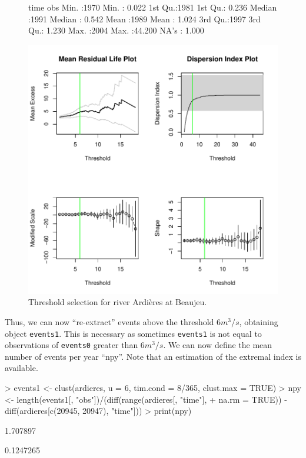 \documentclass[a4paper]{article}
\numberwithin{equation}{section}
\theoremstyle{definition}
\begin{document}
\begin{figure}
\centering
\begin{Schunk}
\begin{Soutput}
      time           obs        
 Min.   :1970   Min.   : 0.022  
 1st Qu.:1981   1st Qu.: 0.236  
 Median :1991   Median : 0.542  
 Mean   :1989   Mean   : 1.024  
 3rd Qu.:1997   3rd Qu.: 1.230  
 Max.   :2004   Max.   :44.200  
                NA's   : 1.000  
\end{Soutput}
\end{Schunk}
\includegraphics{guide-038}
\caption{Threshold selection for river Ardi\`eres at Beaujeu.}
\label{fig:threshSelect}
\end{figure}

Thus, we can now ``re-extract'' events above the threshold $6 m^3/s$,
obtaining object \verb|events1|. This is necessary as sometimes
\verb|events1| is not equal to observations of \verb|events0| greater
than $6 m^3/s$. We can now define the mean number of events per year
``npy''. Note that an estimation of the extremal index is available.
\begin{Schunk}
\begin{Sinput}
> events1 <- clust(ardieres, u = 6, tim.cond = 8/365, clust.max = TRUE)
> npy <- length(events1[, "obs"])/(diff(range(ardieres[, "time"], 
+     na.rm = TRUE)) - diff(ardieres[c(20945, 20947), "time"]))
> print(npy)
\end{Sinput}
\begin{Soutput}
[1] 1.707897
\end{Soutput}
\begin{Soutput}
[1] 0.1247265
\end{Soutput}
\end{Schunk}
\end{document}
